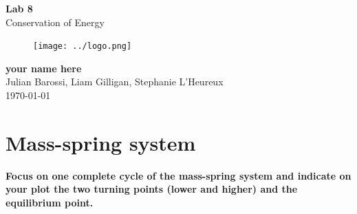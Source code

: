\documentclass[11pt, letterpaper, includehead]{article}
\begin{document}
\begin{titlepage}
  \begin{center}
    \Huge{\textbf{Lab 8}}\\
    \Huge{Conservation of Energy}
    \vfill
    \begin{figure}[H] %
      \centering 
      \texttt{[image: ../logo.png]}
    \end{figure}
    \large{\textbf{your name here}}\\
    \large{Julian Barossi, Liam Gilligan, Stephanie L'Heureux}\\
    \vspace{0.5cm}
    \normalsize
    \today
  \end{center}
\end{titlepage}

\tableofcontents
\pagebreak %

\pagestyle{fancy}
\fancyhead{}

\section{Mass-spring system} %
\textbf{Focus on one complete cycle of the mass-spring system and indicate 
on your plot the two turning points (lower and higher) and the equilibrium point.}\\
\end{document}
